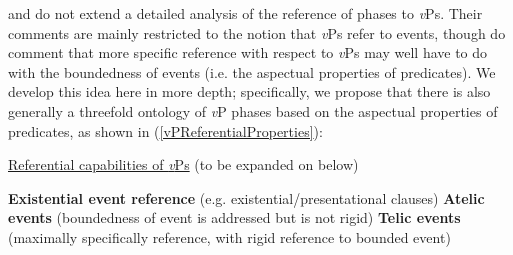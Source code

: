 \documentclass[output=paper
,modfonts
,nonflat
]{langsci/langscibook}
\begin{document}
\citet{SheehanHinzen:2011} and \citet{HinzenSheehan:2013} do not extend a detailed analysis of the reference of phases to \textit{v}Ps. Their comments are mainly restricted to the notion that \textit{v}Ps refer to events, though \citet{SheehanHinzen:2011} do comment that more specific reference with respect to \textit{v}Ps may well have to do with the boundedness of events (i.e. the aspectual properties of predicates). We develop this idea here in more depth; specifically, we propose that there is also generally a threefold ontology of \textit{v}P phases based on the aspectual properties of predicates, as shown in (\ref{vPReferentialProperties}):%

\ea \label{vPReferentialProperties} \underline{Referential capabilities of \textit{v}Ps} (to be expanded on below)

\begin{xlist}
\ex \textbf{Existential event reference} (e.g. existential/presentational clauses)
\ex \textbf{Atelic events} (boundedness of event is addressed but is not rigid)
\ex \textbf{Telic events} (maximally specifically reference, with rigid reference to bounded event)
\end{xlist}

\z
\end{document}
